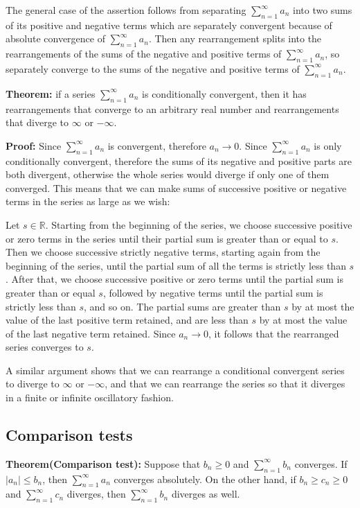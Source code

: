 \documentclass{article}
\begin{document}
The general case of the assertion follows from separating $\sum_{n=1}^{\infty}{a_n}$ into two sums of its positive and negative terms which are separately convergent because of absolute convergence of $\sum_{n=1}^{\infty}{a_n}$. Then any rearrangement splits into the rearrangements of the sums of the negative and positive terms of $\sum_{n=1}^{\infty}{a_n}$, so separately converge to the sums of the negative and positive terms of $\sum_{n=1}^{\infty}{a_n}$.

\textbf{Theorem:} if a series $\sum_{n=1}^{\infty}{a_n}$ is conditionally convergent, then it has rearrangements that converge to an arbitrary real number and rearrangements that diverge to $\infty$ or $-\infty$.

\textbf{Proof:} Since $\sum_{n=1}^{\infty}{a_n}$ is convergent, therefore $a_n\to 0$. Since $\sum_{n=1}^{\infty}{a_n}$ is only conditionally convergent, therefore the sums of its negative and positive parts are both divergent, otherwise the whole series would diverge if only one of them converged. This means that we can make sums of successive positive or negative terms in the series as large as we wish:

Let $s\in \mathbb{R}$. Starting from the beginning of the series, we choose successive positive or zero terms in the series until their partial sum is greater than or equal to $s$. Then we choose successive strictly negative terms, starting again from the beginning of the series, until the partial sum of all the terms is strictly less than $s$. After that, we choose successive positive or zero terms until the partial sum is greater than or equal $s$, followed by negative terms until the partial sum is strictly less than $s$, and so on. The partial sums are greater than $s$ by at most the value of the last positive term retained, and are less than $s$ by at most the value of the last negative term retained. Since $a_n\to 0$, it follows that the rearranged series converges to $s$. 

A similar argument shows that we can rearrange a conditional convergent series to diverge to $\infty$ or $-\infty$, and that we can rearrange the series so that it diverges in a finite or infinite oscillatory fashion.

\subsection{Comparison tests}

\textbf{Theorem(Comparison test):} Suppose that $b_n\geq 0$ and $\sum_{n=1}^{\infty}{b_n}$ converges. If $|a_n|\leq b_n$, then $\sum_{n=1}^{\infty}{a_n}$ converges absolutely. 
On the other hand, if $b_n\geq c_n \geq 0$ and $\sum_{n=1}^{\infty}{c_n}$ diverges, then $\sum_{n=1}^{\infty}{b_n}$ diverges as well.
\end{document}
